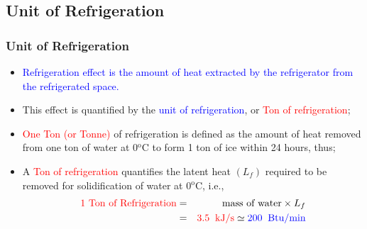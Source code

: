\documentclass[10pt,compress]{beamer}
\begin{document}
\subsection{Unit of Refrigeration}
\begin{frame}
 \frametitle{Unit of Refrigeration}
 \begin{itemize}
  \item <1-> \textcolor{blue}{Refrigeration effect is the amount of heat extracted by the refrigerator from the refrigerated space.}
  \item <2-> This effect is quantified by the \textcolor{blue}{unit of refrigeration}, or \textcolor{red}{Ton of refrigeration};
  \item <3-> \textcolor{red}{One Ton (or Tonne)} of refrigeration is defined as the amount of heat removed from one ton of water at 0$^{\text{o}}$C to form 1 ton of ice within 24 hours, thus;
  \item <4-> A \textcolor{red}{Ton of refrigeration} quantifies the latent heat $\left(L_{f}\right)$ required to be removed for solidification of water at 0$^{\text{o}}$C, i.e.,
   \begin{eqnarray}
    \textcolor{red}{\text{1 Ton of Refrigeration}} &=& \text{mass of water} \times L_{f} \nonumber \\
                                                   &=& \textcolor{red}{3.5\;\;\text{kJ/s}} \simeq \textcolor{blue}{200\;\; \text{Btu/min}}\nonumber 
   \end{eqnarray}
 \end{itemize}
\end{frame}
\end{document}
